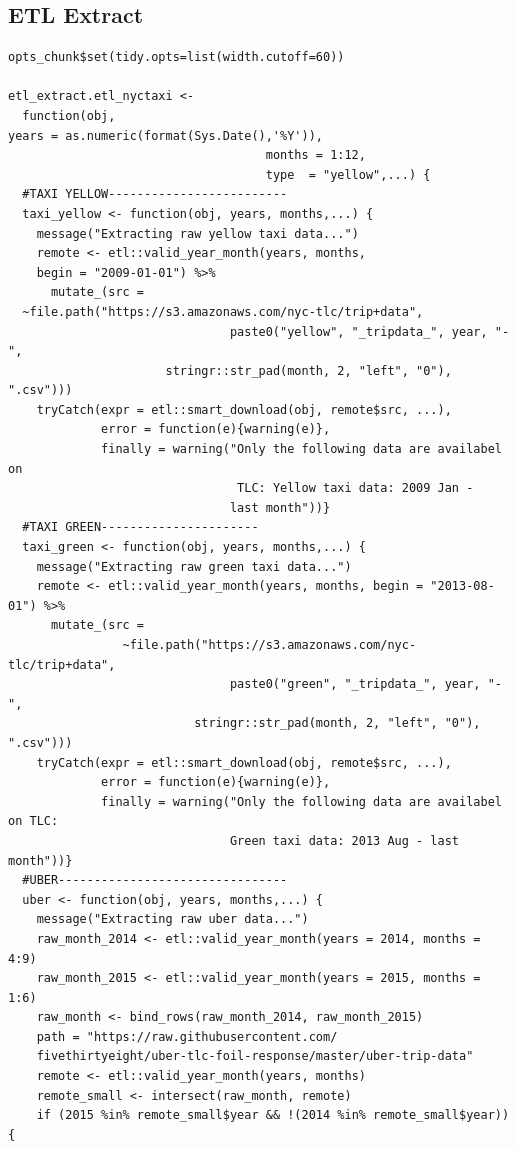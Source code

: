 \documentclass[12pt,twoside]{reedthesis}
\theoremstyle{definition}
\theoremstyle{definition}
\theoremstyle{definition}
\theoremstyle{remark}
\begin{document}
\subsection{ETL Extract}\label{etl-extract}
\begin{verbatim}
opts_chunk$set(tidy.opts=list(width.cutoff=60))

etl_extract.etl_nyctaxi <- 
  function(obj, 
years = as.numeric(format(Sys.Date(),'%Y')), 
                                    months = 1:12, 
                                    type  = "yellow",...) {
  #TAXI YELLOW-------------------------
  taxi_yellow <- function(obj, years, months,...) {
    message("Extracting raw yellow taxi data...")
    remote <- etl::valid_year_month(years, months, 
    begin = "2009-01-01") %>%
      mutate_(src = 
  ~file.path("https://s3.amazonaws.com/nyc-tlc/trip+data", 
                               paste0("yellow", "_tripdata_", year, "-",
                      stringr::str_pad(month, 2, "left", "0"), ".csv"))) 
    tryCatch(expr = etl::smart_download(obj, remote$src, ...),
             error = function(e){warning(e)}, 
             finally = warning("Only the following data are availabel on
                                TLC: Yellow taxi data: 2009 Jan - 
                               last month"))} 
  #TAXI GREEN----------------------
  taxi_green <- function(obj, years, months,...) {
    message("Extracting raw green taxi data...")
    remote <- etl::valid_year_month(years, months, begin = "2013-08-01") %>%
      mutate_(src = 
                ~file.path("https://s3.amazonaws.com/nyc-tlc/trip+data", 
                               paste0("green", "_tripdata_", year, "-",
                          stringr::str_pad(month, 2, "left", "0"), ".csv")))
    tryCatch(expr = etl::smart_download(obj, remote$src, ...),
             error = function(e){warning(e)}, 
             finally = warning("Only the following data are availabel on TLC:
                               Green taxi data: 2013 Aug - last month"))} 
  #UBER--------------------------------
  uber <- function(obj, years, months,...) {
    message("Extracting raw uber data...")
    raw_month_2014 <- etl::valid_year_month(years = 2014, months = 4:9)
    raw_month_2015 <- etl::valid_year_month(years = 2015, months = 1:6)
    raw_month <- bind_rows(raw_month_2014, raw_month_2015)
    path = "https://raw.githubusercontent.com/
    fivethirtyeight/uber-tlc-foil-response/master/uber-trip-data"
    remote <- etl::valid_year_month(years, months)
    remote_small <- intersect(raw_month, remote)
    if (2015 %in% remote_small$year && !(2014 %in% remote_small$year)){

\end{verbatim}
\end{document}
